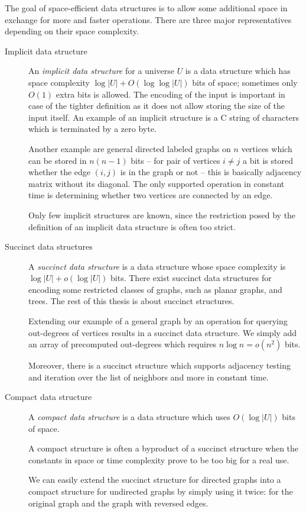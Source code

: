 The goal of space-efficient data structures is to allow some additional space in exchange for more and faster operations.
There are three major representatives depending on their space complexity.

\begin{description}
	\item[Implicit data structure]
	An \emph{implicit data structure} for a universe $U$ is a data structure which has space complexity $ \log |U| + O(\log \log |U|) $ bits of space; sometimes only $O(1)$ extra bits is allowed.
	The encoding of the input is important in case of the tighter definition as it does not allow storing the size of the input itself.
	An example of an implicit structure is a C string of characters which is terminated by a zero byte.
	
	Another example\label{ex:implicit-graph} are general directed labeled graphs on $n$ vertices which can be stored in $n (n - 1)$ bits -- for pair of vertices $i \ne j$ a bit is stored whether the edge $(i, j)$ is in the graph or not -- this is basically adjacency matrix without its diagonal.
	The only supported operation in constant time is determining whether two vertices are connected by an edge.
	
	Only few implicit structures are known, since the restriction posed by the definition of an implicit data structure is often too strict.

	\item[Succinct data structures]
	A \emph{succinct data structure} is a data structure whose space complexity is $ \log |U| + o(\log |U|) $ bits.
	There exist succinct data structures for encoding some restricted classes of graphs, such as planar graphs, and trees.
	The rest of this thesis is about succinct structures.
	
	Extending our example of a general graph by an operation for querying out-degrees of vertices results in a succinct data structure.
	We simply add an array of precomputed out-degrees which requires $n \log n = o(n^2)$ bits.
	
	Moreover, there is a succinct structure which supports adjacency testing and iteration over the list of neighbors and more in constant time. \cite[Theorem~6.1]{raman2007succinct}
	
	\item[Compact data structure]
	A \emph{compact data structure} is a data structure which uses $ O(\log |U|) $ bits of space.
	
	A compact structure is often a byproduct of a succinct structure when the constants in space or time complexity prove to be too big for a real use. \cite{gonzalez2005practical}
	
	We can easily extend the succinct structure for directed graphs into a compact structure for undirected graphs by simply using it twice: for the original graph and the graph with reversed edges.
\end{description}

